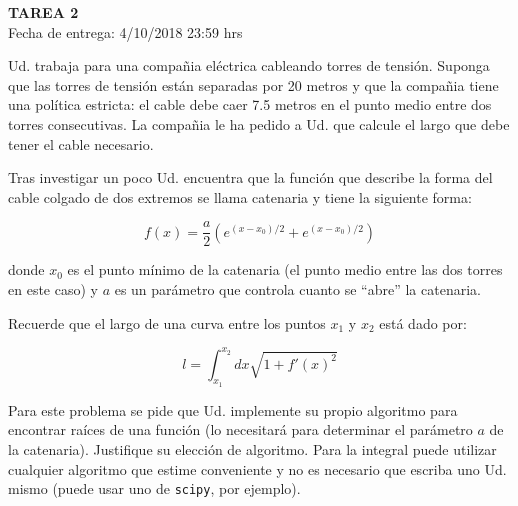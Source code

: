 \documentclass[letter, 11pt]{article}
\newcommand{\scipy}{\texttt{scipy}}
\newcommand{\tareanro}{2}
\newcommand{\fechaentrega}{4/10/2018 23:59 hrs}
\begin{document}
\thispagestyle{firstpage}

\begin{center}
  {\uppercase{\LARGE \bf Tarea \tareanro}}\\
  Fecha de entrega: \fechaentrega
\end{center}



Ud. trabaja para una compañia eléctrica cableando torres de tensión. Suponga
que las torres de tensión están separadas por 20 metros y que la compañia tiene
una política estricta: el cable debe caer 7.5 metros en el punto medio entre
dos torres consecutivas. La compañia le ha pedido a Ud. que calcule el largo
que debe tener el cable necesario.

Tras investigar un poco Ud. encuentra que la función que describe la forma del
cable colgado de dos extremos se llama catenaria y tiene la siguiente forma:

$$ f(x) = \frac{a}{2} \left( e^{(x-x_0)/2} + e^ {(x-x_0)/2} \right) $$

\noindent donde $x_0$ es el punto mínimo de la catenaria (el punto medio entre
las dos torres en este caso) y $a$ es un parámetro que controla cuanto se
``abre'' la catenaria.

\begin{ayuda}
  \small
  Recuerde que el largo de una curva entre los puntos $x_1$ y $x_2$ está dado
  por:

  $$ l = \int_{x_1}^{x_2}dx\sqrt{1 + f'(x)^2} $$

\end{ayuda}

Para este problema se pide que Ud. implemente su propio algoritmo para
encontrar raíces de una función (lo necesitará para determinar el parámetro $a$
de la catenaria). Justifique su elección de algoritmo. Para la integral puede
utilizar cualquier algoritmo que estime conveniente y no es necesario que
escriba uno Ud. mismo (puede usar uno de \scipy, por ejemplo).


\end{document}
